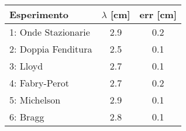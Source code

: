 \begin{table}[H]
    \centering
    \begin{tabular}{|l|c c|}
        \hline 
           Esperimento & $\lambda$ [cm] & err [cm]   \\ \hline
        1: Onde Stazionarie & 2.9   & 0.2   \\
        2: Doppia Fenditura & 2.5   & 0.1   \\
        3: Lloyd            & 2.7   & 0.1  \\
        4: Fabry-Perot     & 2.7   & 0.2   \\ 
        5: Michelson        & 2.9   & 0.1   \\
        6: Bragg            & 2.8 & 0.1   \\ \hline
    \end{tabular}
\end{table}
%
